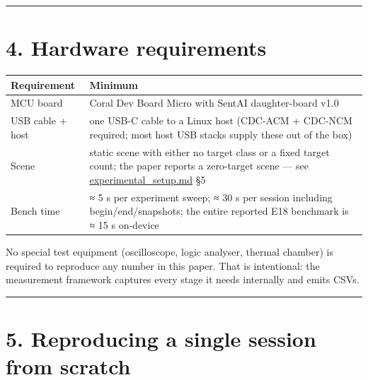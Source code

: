 \begin{center}\rule{0.5\linewidth}{0.5pt}\end{center}

\section{4. Hardware requirements}\label{hardware-requirements}

{\def\LTcaptype{none} %
\begin{longtable}[]{@{}
  >{\raggedright\arraybackslash}p{}
  >{\raggedright\arraybackslash}p{}@{}}
\toprule\noalign{}
\begin{minipage}[b]{\linewidth}\raggedright
Requirement
\end{minipage} & \begin{minipage}[b]{\linewidth}\raggedright
Minimum
\end{minipage} \\
\midrule\noalign{}
\endhead
\bottomrule\noalign{}
\endlastfoot
MCU board & Coral Dev Board Micro with SentAI daughter-board v1.0 \\
USB cable + host & one USB-C cable to a Linux host (CDC-ACM + CDC-NCM
required; most host USB stacks supply these out of the box) \\
Scene & static scene with either no target class or a fixed target
count; the paper reports a zero-target scene --- see
\url{experimental_setup.md} §5 \\
Bench time & ≈ 5 s per experiment sweep; ≈ 30 s per session including
begin/end/snapshots; the entire reported E18 benchmark is ≈ 15 s
on-device \\
\end{longtable}
}

No special test equipment (oscilloscope, logic analyser, thermal
chamber) is required to reproduce any number in this paper. That is
intentional: the measurement framework captures every stage it needs
internally and emits CSVs.

\begin{center}\rule{0.5\linewidth}{0.5pt}\end{center}

\section{5. Reproducing a single session from
scratch}\label{reproducing-a-single-session-from-scratch}

